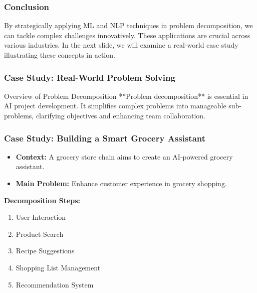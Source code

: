 \documentclass[aspectratio=169]{beamer}
\begin{document}
\begin{frame}
    \frametitle{Conclusion}
    By strategically applying ML and NLP techniques in problem decomposition, we can tackle complex challenges innovatively. These applications are crucial across various industries. In the next slide, we will examine a real-world case study illustrating these concepts in action.
\end{frame}

\begin{frame}[fragile]
    \frametitle{Case Study: Real-World Problem Solving}
    \begin{block}{Overview of Problem Decomposition}
        **Problem decomposition** is essential in AI project development. It simplifies complex problems into manageable sub-problems, clarifying objectives and enhancing team collaboration.
    \end{block}
\end{frame}

\begin{frame}[fragile]
    \frametitle{Case Study: Building a Smart Grocery Assistant}
    \begin{itemize}
        \item \textbf{Context:} A grocery store chain aims to create an AI-powered grocery assistant.
        \item \textbf{Main Problem:} Enhance customer experience in grocery shopping.
    \end{itemize}
    
    \textbf{Decomposition Steps:}
    \begin{enumerate}
        \item User Interaction
        \item Product Search
        \item Recipe Suggestions
        \item Shopping List Management
        \item Recommendation System
    \end{enumerate}
\end{frame}
\end{document}
